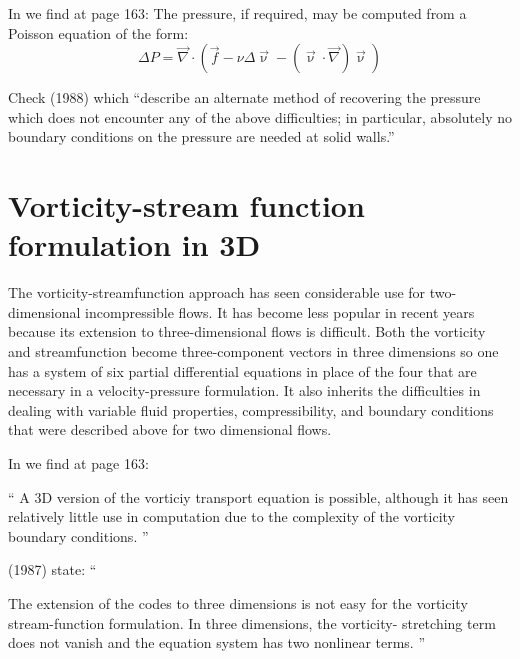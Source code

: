 \vspace{1cm}

In \textcite{reddybook2} we find at page 163:  The pressure, if required, may be computed from a Poisson equation of the form:
\[
\Delta P = \vec\nabla \cdot(\vec{f} - \nu \Delta \vec\upnu - (\vec\upnu\cdot\vec\nabla) \vec\upnu)
\]



Check \textcite{gupe88} (1988) which ``describe an alternate method of recovering the 
pressure which does not encounter any of the above difficulties; in particular, absolutely 
no boundary conditions on the pressure are needed at solid walls.''





\section{Vorticity-stream function formulation in 3D}

The vorticity-streamfunction approach has seen considerable use for two-dimensional incompressible flows. It has become less popular in recent years because its extension to three-dimensional flows is difficult.
Both the vorticity and streamfunction become three-component vectors in three dimensions
so one has a system of six partial differential equations in place of the four that are necessary in a velocity-pressure formulation. It also inherits the difficulties in dealing with variable fluid properties, compressibility, and boundary conditions that were described above for two dimensional flows.

In \textcite{reddybook2} we find at page 163: 
\begin{displayquote}
{\color{darkgray}
``
A 3D version of the  vorticiy transport equation is possible, 
although it has seen relatively little use in computation due to the complexity 
of the vorticity boundary conditions.
'' }
\end{displayquote}

\noindent \textcite{glte87} (1987) state: ``
\begin{displayquote}
{\color{darkgray}
The extension of the codes to three dimensions is not easy
for the vorticity stream-function formulation. In three dimensions, the vorticity-
stretching term does not vanish and the equation system has two nonlinear terms.
''}
\end{displayquote}



